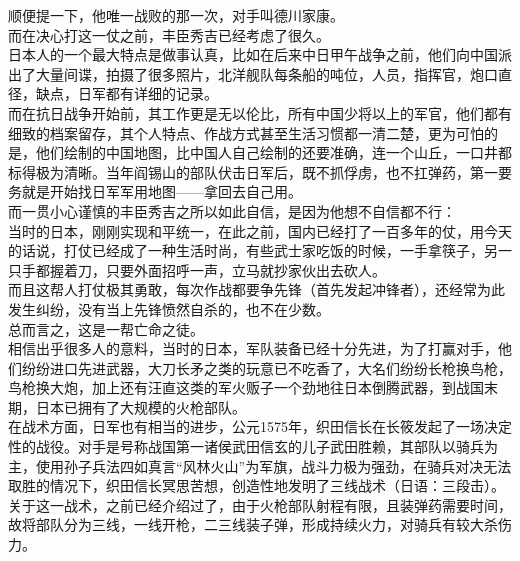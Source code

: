 \begin{multicols}{\theparacolNo}
顺便提一下，他唯一战败的那一次，对手叫德川家康。\\

而在决心打这一仗之前，丰臣秀吉已经考虑了很久。\\

日本人的一个最大特点是做事认真，比如在后来中日甲午战争之前，他们向中国派出了大量间谍，拍摄了很多照片，北洋舰队每条船的吨位，人员，指挥官，炮口直径，缺点，日军都有详细的记录。\\

而在抗日战争开始前，其工作更是无以伦比，所有中国少将以上的军官，他们都有细致的档案留存，其个人特点、作战方式甚至生活习惯都一清二楚，更为可怕的是，他们绘制的中国地图，比中国人自己绘制的还要准确，连一个山丘，一口井都标得极为清晰。当年阎锡山的部队伏击日军后，既不抓俘虏，也不扛弹药，第一要务就是开始找日军军用地图——拿回去自己用。\\

而一贯小心谨慎的丰臣秀吉之所以如此自信，是因为他想不自信都不行：\\

当时的日本，刚刚实现和平统一，在此之前，国内已经打了一百多年的仗，用今天的话说，打仗已经成了一种生活时尚，有些武士家吃饭的时候，一手拿筷子，另一只手都握着刀，只要外面招呼一声，立马就抄家伙出去砍人。\\

而且这帮人打仗极其勇敢，每次作战都要争先锋（首先发起冲锋者），还经常为此发生纠纷，没有当上先锋愤然自杀的，也不在少数。\\

总而言之，这是一帮亡命之徒。\\

相信出乎很多人的意料，当时的日本，军队装备已经十分先进，为了打赢对手，他们纷纷进口先进武器，大刀长矛之类的玩意已不吃香了，大名们纷纷长枪换鸟枪，鸟枪换大炮，加上还有汪直这类的军火贩子一个劲地往日本倒腾武器，到战国末期，日本已拥有了大规模的火枪部队。\\

在战术方面，日军也有相当的进步，公元1575年，织田信长在长筱发起了一场决定性的战役。对手是号称战国第一诸侯武田信玄的儿子武田胜赖，其部队以骑兵为主，使用孙子兵法四如真言“风林火山”为军旗，战斗力极为强劲，在骑兵对决无法取胜的情况下，织田信长冥思苦想，创造性地发明了三线战术（日语：三段击）。\\

关于这一战术，之前已经介绍过了，由于火枪部队射程有限，且装弹药需要时间，故将部队分为三线，一线开枪，二三线装子弹，形成持续火力，对骑兵有较大杀伤力。\\


\end{multicols}
